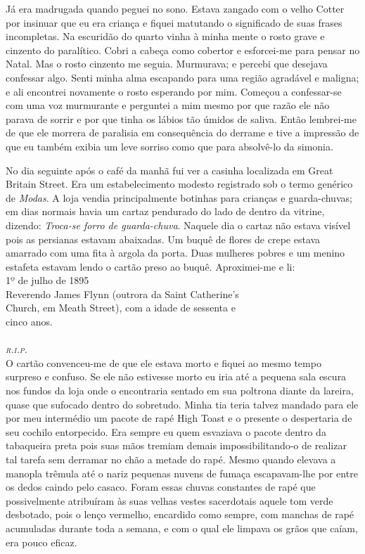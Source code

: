 Já era madrugada quando peguei no sono. Estava zangado com o velho
Cotter por insinuar que eu era criança e fiquei matutando o
significado de suas frases incompletas. Na escuridão do quarto vinha à
minha mente o rosto grave e cinzento do paralítico. Cobri a cabeça
como cobertor e esforcei-me para pensar no Natal. Mas o rosto cinzento
me seguia. Murmurava; e percebi que desejava confessar algo. Senti
minha alma escapando para uma região agradável e maligna; e ali
encontrei novamente o rosto esperando por mim. Começou a confessar-se
com uma voz murmurante e perguntei a mim mesmo por que razão ele não
parava de sorrir e por que tinha os lábios tão úmidos de saliva. Então
lembrei-me de que ele morrera de paralisia em consequência do derrame
e tive a impressão de que eu também exibia um leve sorriso como que
para absolvê-lo da simonia.

No dia seguinte após o café da manhã fui ver a casinha localizada
em Great Britain Street. Era um estabelecimento modesto registrado sob
o termo genérico de \textit{Modas}. A loja vendia
principalmente botinhas para crianças e guarda-chuvas; em dias normais
havia um cartaz pendurado do lado de dentro da vitrine, dizendo:
\textit{Troca-se forro de guarda-chuva}. Naquele dia o cartaz não estava
visível pois as persianas estavam abaixadas. Um buquê de flores de
crepe estava amarrado com uma fita à argola da porta. Duas mulheres
pobres e um menino estafeta estavam lendo o cartão preso ao buquê.
Aproximei-me e li:
\ \\

\mbox{}\hfill 1º de julho de 1895\\
\mbox{}\hfill Reverendo James Flynn (outrora da Saint Catherine's\\
\mbox{}\hfill Church, em Meath Street), com a idade de sessenta e\\
\mbox{}\hfill cinco anos.\\
\ \\
\mbox{}\hfill\textit{\textsc{r.i.p.}}
\ \\

O cartão convenceu-me de que ele estava morto e fiquei ao mesmo tempo
surpreso e confuso. Se ele não estivesse morto eu iria até a pequena
sala escura nos fundos da loja onde o encontraria sentado em sua
poltrona diante da lareira, quase que sufocado dentro do sobretudo.
Minha tia teria talvez mandado para ele por meu intermédio um pacote
de rapé High Toast e o presente o despertaria de seu cochilo
entorpecido. Era sempre eu quem esvaziava o pacote dentro da
tabaqueira preta pois suas mãos tremiam demais impossibilitando-o de
realizar tal tarefa sem derramar no chão a metade do rapé. Mesmo
quando elevava a manopla trêmula até o nariz pequenas nuvens de fumaça
escapavam-lhe por entre os dedos caindo pelo casaco. Foram essas
chuvas constantes de rapé que possivelmente atribuíram às suas velhas
vestes sacerdotais aquele tom verde desbotado, pois o lenço vermelho,
encardido como sempre, com manchas de rapé acumuladas durante toda a
semana, e com o qual ele limpava os grãos que caíam, era pouco eficaz.

